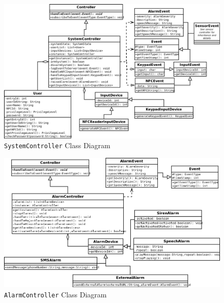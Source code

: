 \documentclass{report}
\begin{document}
\begin{landscape} 
\begin{figure}[p]
    \caption{\texttt{SystemController} Class Diagram}
    \label{fig:system_controller_class_diagram}
    \includegraphics[scale=0.5]{system_controller_class_diagram.png}
\end{figure}
\end{landscape} 

\begin{landscape}
\begin{figure}[p]
    \caption{\texttt{AlarmController} Class Diagram}
    \label{fig:alarm_controller_class_diagram}
    \includegraphics[scale=0.5]{alarm_controller_class_diagram.png}
\end{figure}
\end{landscape}
\end{document}
